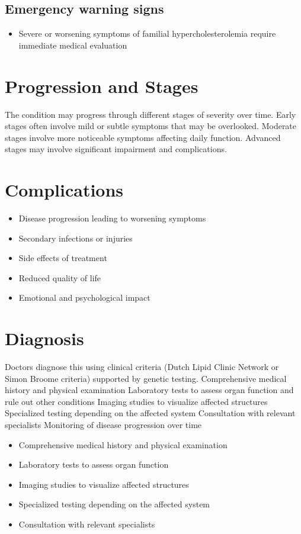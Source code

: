 \subsection{Emergency warning signs}
\begin{itemize}[noitemsep]
  \item Severe or worsening symptoms of familial hypercholesterolemia require immediate medical evaluation
\end{itemize}
\section{Progression and Stages}
The condition may progress through different stages of severity over time. Early stages often involve mild or subtle symptoms that may be overlooked. Moderate stages involve more noticeable symptoms affecting daily function. Advanced stages may involve significant impairment and complications.
\section{Complications}
\begin{itemize}[noitemsep]
  \item Disease progression leading to worsening symptoms
  \item Secondary infections or injuries
  \item Side effects of treatment
  \item Reduced quality of life
  \item Emotional and psychological impact
\end{itemize}
\section{Diagnosis}
Doctors diagnose this using clinical criteria (Dutch Lipid Clinic Network or Simon Broome criteria) supported by genetic testing. Comprehensive medical history and physical examination Laboratory tests to assess organ function and rule out other conditions Imaging studies to visualize affected structures Specialized testing depending on the affected system Consultation with relevant specialists Monitoring of disease progression over time

\begin{itemize}[noitemsep]
  \item Comprehensive medical history and physical examination
  \item Laboratory tests to assess organ function
  \item Imaging studies to visualize affected structures
  \item Specialized testing depending on the affected system
  \item Consultation with relevant specialists
\end{itemize}
